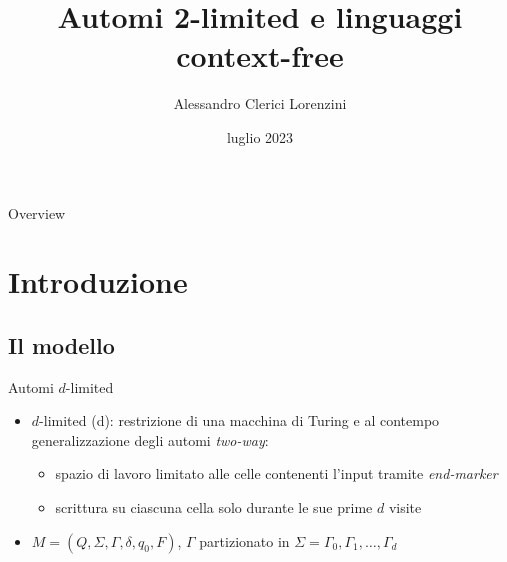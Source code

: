 \documentclass{beamer}
\title{Automi 2-limited e linguaggi context-free}
\author{Alessandro Clerici Lorenzini}
\date{luglio 2023}
\institute{Seminario per l'esame di Teoria dei Linguaggi @ Unimi}
\begin{document}
\maketitle

\begin{frame}{Overview}
	\tableofcontents
\end{frame}



\section{Introduzione}


\subsection{Il modello}
\begin{frame}{Automi $d$-limited}
	\begin{itemize}
		\item $d$-limited (\la d): restrizione di una macchina di Turing e al contempo generalizzazione degli automi \emph{two-way}:
		      \begin{itemize}
			      \item spazio di lavoro limitato alle celle contenenti l'input tramite \emph{end-marker}
			      \item scrittura su ciascuna cella solo durante le sue prime $d$ visite
		      \end{itemize}
		\item $M=(Q,\Sigma,\Gamma,\delta,q_0,F)$, $\Gamma$ partizionato in $\Sigma=\Gamma_0,\Gamma_1,\dots,\Gamma_d$
	\end{itemize}

	\vfill
	\begin{figure}
		\centering
		
	\end{figure}
\end{frame}
\end{document}
